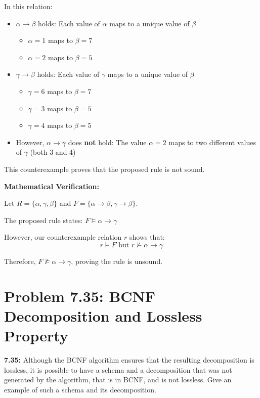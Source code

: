 \documentclass[12pt,a4paper]{article}
\begin{document}
In this relation:
\begin{itemize}
    \item $\alpha \rightarrow \beta$ holds: Each value of $\alpha$ maps to a unique value of $\beta$
    \begin{itemize}
        \item $\alpha = 1$ maps to $\beta = 7$
        \item $\alpha = 2$ maps to $\beta = 5$
    \end{itemize}
    
    \item $\gamma \rightarrow \beta$ holds: Each value of $\gamma$ maps to a unique value of $\beta$
    \begin{itemize}
        \item $\gamma = 6$ maps to $\beta = 7$
        \item $\gamma = 3$ maps to $\beta = 5$
        \item $\gamma = 4$ maps to $\beta = 5$
    \end{itemize}
    
    \item However, $\alpha \rightarrow \gamma$ does \textbf{not} hold: The value $\alpha = 2$ maps to two different values of $\gamma$ (both 3 and 4)
\end{itemize}

This counterexample proves that the proposed rule is not sound.

\textbf{Mathematical Verification:}

Let $R = \{\alpha, \gamma, \beta\}$ and $F = \{\alpha \rightarrow \beta, \gamma \rightarrow \beta\}$.

The proposed rule states: $F \models \alpha \rightarrow \gamma$

However, our counterexample relation $r$ shows that:
$$r \models F \text{ but } r \not\models \alpha \rightarrow \gamma$$

Therefore, $F \not\models \alpha \rightarrow \gamma$, proving the rule is unsound.

\section{Problem 7.35: BCNF Decomposition and Lossless Property}

\begin{questionbox}
\textbf{7.35:} Although the BCNF algorithm ensures that the resulting decomposition is lossless, it is possible to have a schema and a decomposition that was not generated by the algorithm, that is in BCNF, and is not lossless. Give an example of such a schema and its decomposition.
\end{questionbox}
\end{document}
